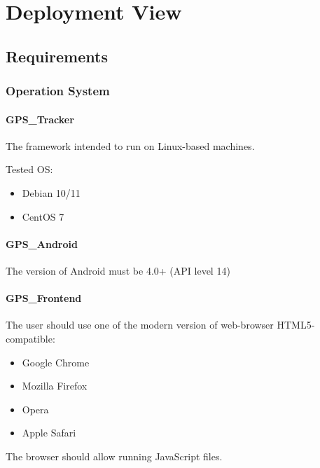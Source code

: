 \section{Deployment View}\label{deployment-view}

\subsection{Requirements}\label{requirements}

\subsubsection{Operation System}\label{operation-system}

\paragraph{GPS\_Tracker}\label{gps_tracker-os}

The framework intended to run on Linux-based machines.

Tested OS:

\begin{itemize}
\tightlist
\item
  Debian 10/11
\item
  CentOS 7
\end{itemize}

\paragraph{GPS\_Android}\label{gps_android}

The version of Android must be 4.0+ (API level 14)

\paragraph{GPS\_Frontend}\label{gps_frontend}

The user should use one of the modern version of web-browser
HTML5-compatible:

\begin{itemize}
\tightlist
\item
  Google Chrome
\item
  Mozilla Firefox
\item
  Opera
\item
  Apple Safari
\end{itemize}

The browser should allow running JavaScript files.

